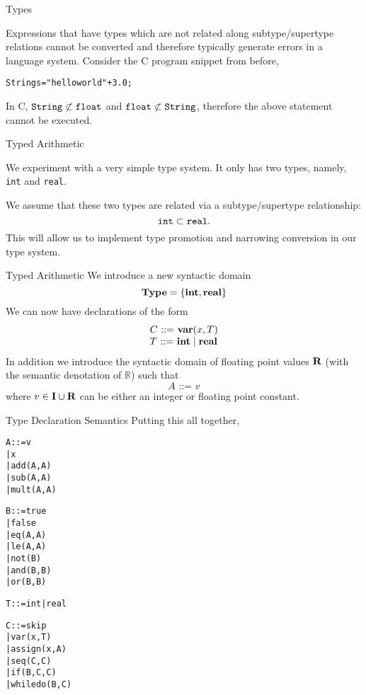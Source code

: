 \documentclass{beamer}
\begin{document}
\begin{frame}[fragile]{Types}

\small
Expressions that have types which are not related along subtype/supertype relations cannot be converted
and therefore typically generate errors in a language system.  Consider the C program snippet from before,
{\scriptsize
\begin{alltt}
  String s = "hello world" + 3.0;
\end{alltt}
}
In C, ${\tt String} \not\subset {\tt float}$ and ${\tt float} \not\subset {\tt String}$, therefore the above statement cannot be
executed.
\end{frame}

\begin{frame}[fragile]{Typed Arithmetic}

We experiment with a very simple type system.  It only has two types, namely, {\tt int} and {\tt real}.

\vspace{.1in}
We assume that these two types are related via a subtype/supertype relationship:
\[
{\tt int} \subset {\tt real}.
\]
This will allow us to implement type promotion and narrowing conversion in our type system.
\end{frame}

\begin{frame}[fragile]{Typed Arithmetic}
We introduce a new syntactic domain
\[
	\mbox{\bf Type} = \{ {\bf int}, {\bf real}\}
\]
We can now have declarations of the form
\[
\begin{array}{l}
C \mbox{ ::= } {\bf var}(x,T)\\
T \mbox{ ::= } {\bf int} \; |\;  {\bf real}
\end{array}
\]
In addition we introduce the syntactic domain of floating point values $\mbox{\bf R}$ (with the semantic denotation of $\mathbb R$) such that
\[
A \mbox{ ::= } v
\]
where $v\in \mbox{\bf I}\cup\mbox{\bf R}$ can be either an integer or floating point constant.
\end{frame}

\begin{frame}[fragile]{\large Type Declaration Semantics}
Putting this all together,

\vspace{.1in}

\begin{minipage}[t]{1.8in}
\tiny
\begin{alltt}
  A ::= {\color{red}v}  
     |  x
     |  add(A,A)
     |  sub(A,A)
     |  mult(A,A)

  B ::= true
     |  false
     |  eq(A,A)
     |  le(A,A)
     |  not(B)
     |  and(B,B)
     |  or(B,B)
\end{alltt}
\end{minipage}
\begin{minipage}[t]{1.8in}
\tiny
\begin{alltt}
  {\color{red}T ::= int  |  real} 
      
  C ::= skip
     |  {\color{red}var(x,T) }
     |  assign(x,A)
     |  seq(C,C)
     |  if(B,C,C)
     |  whiledo(B,C)
\end{alltt}
\end{minipage}
\end{frame}
\end{document}
